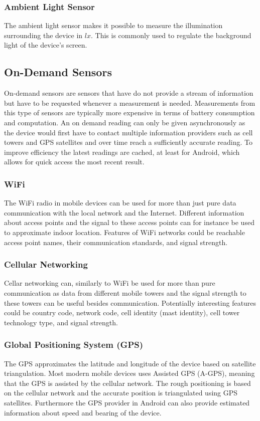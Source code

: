 \subsubsection{Ambient Light Sensor}

The ambient light sensor makes it possible to measure the illumination surrounding the device in $lx$. This is commonly used to regulate the background light of the device's screen.


\subsection{On-Demand Sensors}
On-demand sensors are sensors that have do not provide a stream of information but have to be requested whenever a measurement is needed. Measurements from this type of sensors are typically more expensive in terms of battery consumption and computation. An on demand reading can only be given asynchronously as the device would first have to contact multiple information providers such as cell towers and GPS satellites and over time reach a sufficiently accurate reading. To improve efficiency the latest readings are cached, at least for Android, which allows for quick access the most recent result.

\subsubsection{WiFi}
The WiFi radio in mobile devices can be used for more than just pure data communication with the local network and the Internet. Different information about access points and the signal to these access points can for instance be used to approximate indoor location.  
Features of WiFi networks could be reachable access point names, their communication standards, and signal strength. 

\subsubsection{Cellular Networking}
Cellar networking can, similarly to WiFi be used for more than pure communication as data from different mobile towers and the signal strength to these towers can be useful besides communication. Potentially interesting features could be country code, network code, cell identity (mast identity), cell tower technology type, and signal strength.

\subsubsection{Global Positioning System (GPS)}
The GPS approximates the latitude and longitude of the device based on satellite triangulation. Most modern mobile devices uses Assisted GPS (A-GPS), meaning that the GPS is assisted by the cellular network. The rough positioning is based on the cellular network and the accurate position is triangulated using GPS satellites. Furthermore the GPS provider in Android can also provide estimated information about speed and bearing of the device.

